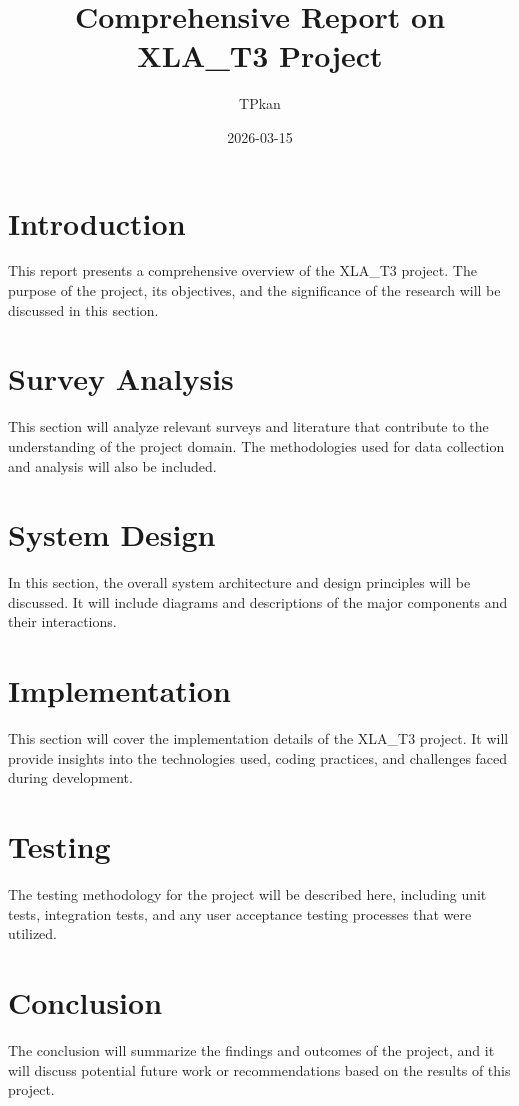 \documentclass{report}
\title{Comprehensive Report on XLA_T3 Project}
\author{TPkan}
\date{2026-03-15}
\begin{document}
\maketitle
\tableofcontents
\newpage

\section{Introduction}
This report presents a comprehensive overview of the XLA_T3 project. The purpose of the project, its objectives, and the significance of the research will be discussed in this section.

\section{Survey Analysis}
This section will analyze relevant surveys and literature that contribute to the understanding of the project domain. The methodologies used for data collection and analysis will also be included.

\section{System Design}
In this section, the overall system architecture and design principles will be discussed. It will include diagrams and descriptions of the major components and their interactions.

\section{Implementation}
This section will cover the implementation details of the XLA_T3 project. It will provide insights into the technologies used, coding practices, and challenges faced during development.

\section{Testing}
The testing methodology for the project will be described here, including unit tests, integration tests, and any user acceptance testing processes that were utilized.

\section{Conclusion}
The conclusion will summarize the findings and outcomes of the project, and it will discuss potential future work or recommendations based on the results of this project.
\end{document}
